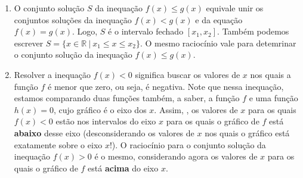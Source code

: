 \begin{observation}{}
\begin{enumerate}
\item{}
O conjunto solução $S$ da inequação $f(x) \leq g(x)$ equivale unir os conjuntos soluções da inequação $f(x) < g(x)$ e da equação $f(x) = g(x)$. Logo, $S$ é o intervalo fechado $[x_1, x_2]$. Também podemos escrever $S = \{x \in \mathbb{R}\ | \ x_1 \leq x \leq x_2\}$. O mesmo raciocínio vale para detemrinar o conjunto solução da inequação $f(x) \leq g(x)$.

\item{}
Resolver a inequação $f(x) < 0$ significa buscar os valores de $x$ nos quais a função $f$ é menor que zero, ou seja, é negativa. Note que nessa inequação, estamos comparando duas funções também, a saber, a função $f$ e uma função $h(x)=0$, cujo gráfico é o eixo dos $x$. Assim, , os valores de $x$ para os quais $f(x) <0$ estão nos intervalos do eixo $x$ para os quais o gráfico de $f$ está \textbf{abaixo} desse eixo (desconsiderando os valores de $x$ nos quais o gráfico está exatamente sobre o eixo $x$!). O raciocínio para o conjunto solução da inequação $f(x) >0$ é o mesmo, considerando agora os valores de $x$ para os quais o gráfico de $f$ está \textbf{acima} do eixo $x$.
\end{enumerate}

\end{observation}


\label{\detokenize{AF107-6:inequacoes}}\label{\detokenize{AF107-6::doc}}


